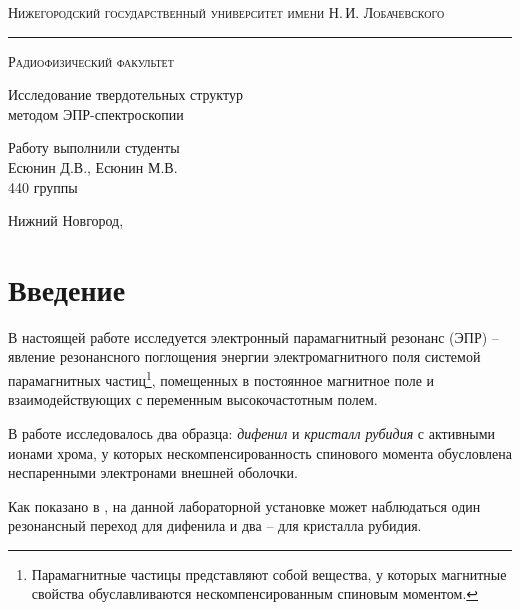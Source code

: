 \documentclass[a4paper,14pt]{extarticle}
\def\labauthors{Есюнин Д.В., Есюнин М.В.}
\def\labtheme{Исследование твердотельных структур \\[0.2em] методом ЭПР-спектроскопии}
\begin{document}
\begin{titlepage}
	
	\begin{center}
		
		
		\textsc{Нижегородский государственный университет имени Н.\,И. Лобачевского}
		\vskip 4pt \hrule \vskip 8pt
		\textsc{Радиофизический факультет}
		
		\vfill
		
		{\Large\labtheme}
		
	\end{center}
	
	\vfill
	
	\begin{flushright}
		{Работу выполнили студенты\\ \labauthors\\ 440 группы}
	\end{flushright}
	
	\vfill
	
	\begin{center}
		Нижний Новгород, \the\year
	\end{center}
\end{titlepage}
\newpage



\section*{Введение}
В настоящей работе исследуется электронный парамагнитный резонанс (ЭПР) -- явление резонансного поглощения энергии электромагнитного поля системой парамагнитных частиц\footnote{Парамагнитные частицы представляют собой вещества, у которых магнитные свойства обуславливаются нескомпенсированным спиновым моментом.}, помещенных в постоянное магнитное поле и взаимодействующих с переменным высокочастотным полем.

В работе исследовалось два образца: \textit{дифенил} и \textit{кристалл рубидия} с активными ионами хрома, у которых нескомпенсированность спинового момента обусловлена неспаренными электронами внешней оболочки. 

Как показано в \cite[стр. 20, 24]{mar}, на данной лабораторной установке может наблюдаться один резонансный переход для дифенила и два -- для кристалла рубидия.
\end{document}
